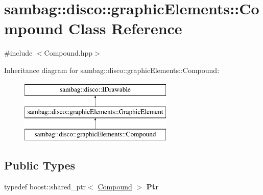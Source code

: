 \hypertarget{classsambag_1_1disco_1_1graphic_elements_1_1_compound}{
\section{sambag::disco::graphicElements::Compound Class Reference}
\label{classsambag_1_1disco_1_1graphic_elements_1_1_compound}
}


{\ttfamily \#include $<$Compound.hpp$>$}

Inheritance diagram for sambag::disco::graphicElements::Compound:\begin{figure}[H]
\begin{center}
\leavevmode
\includegraphics[height=3.000000cm]{classsambag_1_1disco_1_1graphic_elements_1_1_compound}
\end{center}
\end{figure}
\subsection*{Public Types}
\begin{DoxyCompactItemize}
\item 
\hypertarget{classsambag_1_1disco_1_1graphic_elements_1_1_compound_af349c4293a7d91edb8dc755ed50c1e9f}{
typedef boost::shared\_\-ptr$<$ \hyperlink{classsambag_1_1disco_1_1graphic_elements_1_1_compound}{Compound} $>$ {\bfseries Ptr}}
\label{classsambag_1_1disco_1_1graphic_elements_1_1_compound_af349c4293a7d91edb8dc755ed50c1e9f}

\end{DoxyCompactItemize}
